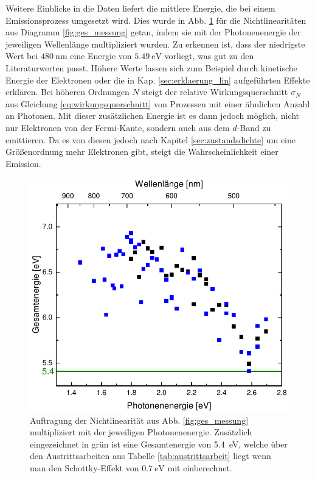 \documentclass[bachelor,       %
               twoside,        %
               BCOR10mm,       %
               english,ngerman, %
               final,          %
               ]{GAUBM}
\begin{document}
\newpage
Weitere Einblicke in die Daten liefert die mittlere Energie, die bei einem Emissionsprozess umgesetzt wird.
Dies wurde in Abb. \ref{fig:ges_energie} für die Nichtlinearitäten aus Diagramm \ref{fig:ges_messung} getan, indem sie mit der Photonenenergie der jeweiligen Wellenlänge multipliziert wurden.
Zu erkennen ist, dass der niedrigste Wert bei $\SI{480}{\nano\meter}$ eine Energie von $\SI{5.49}\electronvolt$ vorliegt, was gut zu den Literaturwerten passt.
Höhere Werte lassen sich zum Beispiel durch kinetische Energie der Elektronen oder die in Kap. \ref{sec:erklaerung_lin} aufgeführten Effekte erklären.
Bei höheren Ordnungen $N$ steigt der relative Wirkungsquerschnitt $\sigma_N$ aus Gleichung \ref{eq:wirkungsquerschnitt} von Prozessen mit einer ähnlichen Anzahl an Photonen.
Mit dieser zusätzlichen Energie ist es dann jedoch möglich, nicht nur Elektronen von der Fermi-Kante, sondern auch aus dem $d$-Band zu emittieren.
Da es von diesen jedoch nach Kapitel \ref{sec:zustandsdichte} um eine Größenordnung mehr Elektronen gibt, steigt die Wahrscheinlichkeit einer Emission.\newline\newline



 



\begin{figure}[h!]
\centering
\includegraphics{Gesamtenergie}
\caption{Auftragung der Nichtlinearität aus Abb. \ref{fig:ges_messung} multipliziert mit der jeweiligen Photonenenergie. Zusätzlich eingezeichnet in grün ist eine Gesamtenergie von \SI{5.4}{\eV}, welche über den Austrittsarbeiten aus Tabelle \ref{tab:austrittsarbeit} liegt wenn man den Schottky-Effekt von $\SI{0.7}{\eV}$ mit einberechnet.}
\label{fig:ges_energie}
\end{figure}
\end{document}
